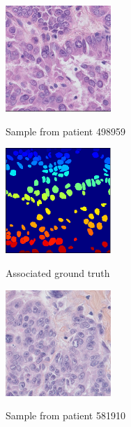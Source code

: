 \documentclass{article}
\begin{document}
\begin{figure}[htb]
\begin{minipage}[b]{.48\linewidth}
  \centering
  \centerline{\includegraphics[width=4.0cm]{RGB_1}}
  \centerline{Sample from patient 498959}\medskip
\end{minipage}
\hfill
\begin{minipage}[b]{0.48\linewidth}
  \centering
  \centerline{\includegraphics[width=4.0cm]{GT_1}}
  \centerline{Associated ground truth}\medskip
\end{minipage}
%
%
\begin{minipage}[b]{.48\linewidth}
  \centering
  \centerline{\includegraphics[width=4.0cm]{RGB_2}}
  \centerline{Sample from patient 581910}\medskip
\end{minipage}
\hfill
\begin{minipage}[b]{0.48\linewidth}
  \centering

\end{minipage}
\end{figure}
\end{document}
